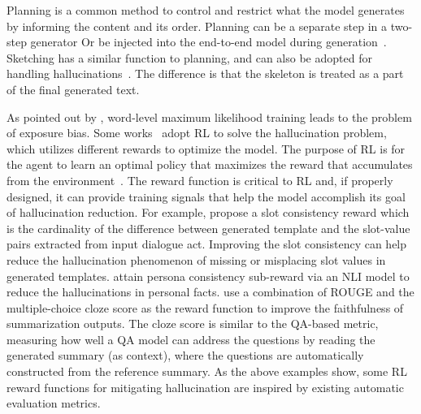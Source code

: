 Planning is a common method to control and restrict what the model generates by informing the content and its order\ziwei{~}. Planning can be a separate step in a two-step generator\ziwei{~}
Or be injected into the end-to-end model during generation~.
 Sketching has a similar function to planning, and can also be adopted for handling hallucinations~. The difference is that the skeleton is treated as a part of the final generated text.
\vspace{-0.5em}

As pointed out by , word-level maximum likelihood training leads to the problem of exposure bias.
Some works~ adopt RL to solve the hallucination problem, which utilizes different rewards to optimize the model.
The purpose of RL is for the agent to learn an optimal policy that maximizes the reward that accumulates from the environment~.
The reward function is critical to RL and, if properly designed, it can provide training signals that help the model accomplish its goal of hallucination reduction.
For example,  propose a slot consistency reward which is the cardinality of the difference between generated template and the slot-value pairs extracted from input dialogue act. Improving the slot consistency can help reduce the hallucination phenomenon of missing or misplacing slot values in generated templates.
 attain persona consistency sub-reward via an NLI model to reduce the hallucinations in personal facts.
 use a combination of ROUGE and the multiple-choice cloze score as the reward function to improve the faithfulness of summarization outputs. The cloze score is similar to the QA-based metric, measuring how well a QA model can address the questions by reading the generated summary (as context), where the questions are automatically constructed from the reference summary.
As the above examples show, some RL reward functions for mitigating hallucination are inspired by existing automatic evaluation metrics.

